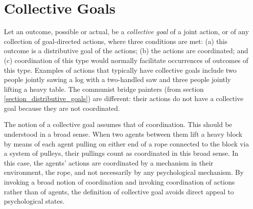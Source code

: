 \documentclass[12pt,a4paper]{extarticle}
\begin{document}
\label{end_section_distributive_goals}


\section{Collective Goals}
	\label{section_collective_goals}

Let an outcome, possible or actual, be a \emph{collective goal \label{df_collective_goal}} of a joint action, or of any collection of goal-directed actions, where three conditions are met: 
	(a) this outcome is a distributive goal of the actions; 
	(b) the actions are coordinated; and 
	(c)  coordination of this type would normally  facilitate occurrences of outcomes of this type.  
Examples of actions  that typically have collective goals include two people jointly sawing a log with a two-handled saw and  
three people jointly lifting a heavy table.
The communist bridge painters (from section \ref{section_distributive_goals}) are different: their actions do not have a collective goal because they are not coordinated.

The notion of a collective goal assumes that of coordination.  This should be understood in a broad sense.  
When two agents between them lift a heavy block by means of each agent pulling on either end of a rope connected to the block via a system of pulleys, their pullings count as coordinated in this broad sense.  
In this case, the agents' actions are coordinated by a mechanism in their environment, the rope, and not necessarily by any psychological mechanism.  
By invoking a broad notion of coordination 
and invoking coordination of actions rather than of agents,
the definition of collective goal avoids direct appeal to psychological states.
\end{document}
